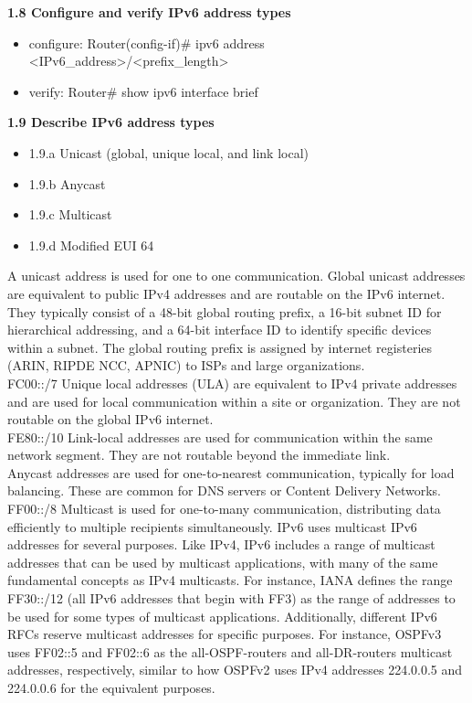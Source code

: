 \documentclass{article}
\begin{document}
\textbf{1.8 Configure and verify IPv6 address types}
\begin{itemize}
\item configure: Router(config-if)\# ipv6 address \textless IPv6\_address\textgreater/\textless prefix\_length\textgreater
\item verify: Router\# show ipv6 interface brief
 \end{itemize}
  
\textbf{1.9 Describe IPv6 address types}
\begin{itemize}
\item 1.9.a Unicast (global, unique local, and link local)
\item 1.9.b Anycast
\item 1.9.c Multicast
\item 1.9.d Modified EUI 64
\end{itemize}

	A unicast address is used for one to one communication. Global unicast addresses are equivalent to public IPv4 addresses and are routable on the IPv6 internet. They typically consist of a 48-bit global routing prefix, a 16-bit subnet ID for hierarchical addressing, and a 64-bit interface ID to identify specific devices within a subnet. The global routing prefix is assigned by internet registeries (ARIN, RIPDE NCC, APNIC) to ISPs and large organizations.\\
	
	 FC00::/7 Unique local addresses (ULA) are equivalent to IPv4 private addresses and are used for local communication within a site or organization. They are not routable on the global IPv6 internet.\\
	 
	  FE80::/10 Link-local addresses are used for communication within the same network segment. They are not routable beyond the immediate link.\\
	  
	  Anycast addresses are used for one-to-nearest communication, typically for load balancing. These are common for DNS servers or Content Delivery Networks.\\
	
	 FF00::/8 Multicast is used for one-to-many communication, distributing data efficiently to multiple recipients simultaneously. IPv6 uses multicast IPv6 addresses for several purposes. Like IPv4, IPv6 includes a range of multicast addresses that can be used by multicast applications, with many of the same fundamental concepts as IPv4 multicasts. For instance, IANA defines the range FF30::/12 (all IPv6 addresses that begin with FF3) as the range of addresses to be used for some types of multicast applications. Additionally, different IPv6 RFCs reserve multicast addresses for specific purposes. For instance, OSPFv3 uses FF02::5 and FF02::6 as the all-OSPF-routers and all-DR-routers multicast addresses, respectively, similar to how OSPFv2 uses IPv4 addresses 224.0.0.5 and 224.0.0.6 for the equivalent purposes.\\
	 
\end{document}
